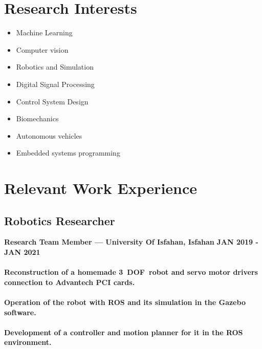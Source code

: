 \documentclass[a4paper]{article}
\begin{document}
    \section{Research Interests}


        \begin{multicols}{2}[]
            \begin{itemize}
                \itemsep0em 
                \item Machine Learning
                \item Computer vision
                \item Robotics and Simulation
                \item Digital Signal Processing
                \item Control System Design
                \item Biomechanics
                \item Autonomous vehicles
                \item Embedded systems programming
            \end{itemize}
        \end{multicols}

    \section{Relevant Work Experience}
        \subsection{Robotics Researcher}
        {\bfseries\small Research Team Member — University Of Isfahan, Isfahan}
        \hfill
        {\bfseries\small JAN 2019 - JAN 2021}

        \paragraph{Reconstruction of a homemade 3 DOF robot and servo motor drivers connection to Advantech PCI cards.}
        \paragraph{Operation of the robot with ROS and its simulation in the Gazebo software.}
        \paragraph{Development of a controller and motion planner for it in the ROS environment.}
\end{document}
